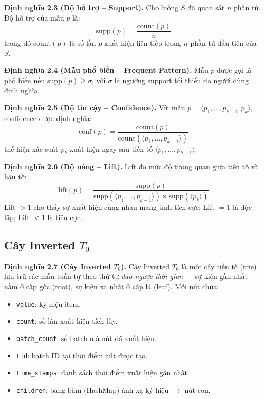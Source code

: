 \documentclass[14pt,a4paper,oneside]{extreport}
\begin{document}
\textbf{Định nghĩa 2.3 (Độ hỗ trợ -- Support).} Cho luồng $S$ đã quan sát $n$ phần tử. Độ hỗ trợ của mẫu $p$ là:
\begin{equation}
    \text{supp}(p) = \frac{\text{count}(p)}{n}
\end{equation}
trong đó $\text{count}(p)$ là số lần $p$ xuất hiện liên tiếp trong $n$ phần tử đầu tiên của $S$.

\textbf{Định nghĩa 2.4 (Mẫu phổ biến -- Frequent Pattern).} Mẫu $p$ được gọi là phổ biến nếu $\text{supp}(p) \geq \sigma$, với $\sigma$ là ngưỡng support tối thiểu do người dùng định nghĩa.

\textbf{Định nghĩa 2.5 (Độ tin cậy -- Confidence).} Với mẫu $p = \langle p_1, \dots, p_{k-1}, p_k \rangle$, confidence được định nghĩa:
\begin{equation}
    \text{conf}(p) = \frac{\text{count}(p)}{\text{count}(\langle p_1, \dots, p_{k-1} \rangle)}
\end{equation}
thể hiện xác suất $p_k$ xuất hiện ngay sau tiền tố $\langle p_1, \dots, p_{k-1} \rangle$.

\textbf{Định nghĩa 2.6 (Độ nâng -- Lift).} Lift đo mức độ tương quan giữa tiền tố và hậu tố:
\begin{equation}
    \text{lift}(p) = \frac{\text{supp}(p)}{\text{supp}(\langle p_1, \dots, p_{k-1} \rangle) \times \text{supp}(\langle p_k \rangle)}
\end{equation}
Lift $> 1$ cho thấy sự xuất hiện cùng nhau mang tính tích cực; Lift $= 1$ là độc lập; Lift $< 1$ là tiêu cực.

\subsection{Cây Inverted $T_0$}

\textbf{Định nghĩa 2.7 (Cây Inverted $T_0$).} Cây Inverted $T_0$ là một cây tiền tố (trie) lưu trữ các mẫu tuần tự theo thứ tự \textit{đảo ngược thời gian} --- sự kiện gần nhất nằm ở cấp gốc (root), sự kiện xa nhất ở cấp lá (leaf). Mỗi nút chứa:
\begin{itemize}
    \item \texttt{value}: ký hiệu item.
    \item \texttt{count}: số lần xuất hiện tích lũy.
    \item \texttt{batch\_count}: số batch mà nút đã xuất hiện.
    \item \texttt{tid}: batch ID tại thời điểm nút được tạo.
    \item \texttt{time\_stamps}: danh sách thời điểm xuất hiện gần nhất.
    \item \texttt{children}: bảng băm (HashMap) ánh xạ ký hiệu $\rightarrow$ nút con.
\end{itemize}
\end{document}
